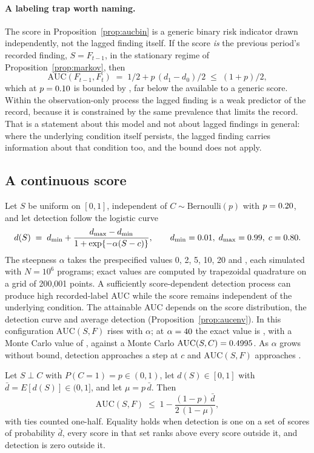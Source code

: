 \paragraph{A labeling trap worth naming.} The score in
Proposition~\ref{prop:aucbin} is a generic binary risk indicator drawn
independently, not the lagged finding itself. If the score \emph{is} the
previous period's recorded finding, $S = F_{t-1}$, in the stationary regime of
Proposition~\ref{prop:markov}, then
%
\[
  \mathrm{AUC}(F_{t-1}, F_t) \;=\; 1/2 + p\,(d_1 - d_0)/2
  \;\leq\; (1+p)/2,
\]
%
which at $p = 0.10{}$ is bounded by \nBinStationaryBound{}, far below the
\nBinAucExact{} available to a generic score. Within the observation-only
process the lagged finding is a weak predictor of the record, because it is
constrained by the same prevalence that limits the record. That is a statement
about this model and not about lagged findings in general: where the
underlying condition itself persists, the lagged finding carries information
about that condition too, and the bound does not apply.

\subsection{A continuous score}

Let $S$ be uniform on $[0,1]$, independent of $C \sim \mathrm{Bernoulli}(p)$
with $p = 0.20{}$, and let detection follow the logistic curve
%
\[
  d(S) \;=\; d_{\min} + \frac{d_{\max} - d_{\min}}{1 + \exp\{-\alpha (S - c)\}} ,
  \qquad d_{\min} = 0.01{},\; d_{\max} = 0.99{},\; c = 0.80{} .
\]
%
The steepness $\alpha$ takes the prespecified values 0, 2, 5, 10, 20 and
\nContAlphaMax{}, each simulated with $N = 10^6$ programs; exact values are
computed by trapezoidal quadrature on a grid of 200,001 points. A sufficiently
score-dependent detection process can produce high recorded-label AUC while
the score remains independent of the underlying condition. The attainable AUC
depends on the score distribution, the detection curve and average detection
(Proposition~\ref{prop:aucenv}). In this configuration $\mathrm{AUC}(S,F)$
rises with $\alpha$; at $\alpha = 40{}$ the exact value is
\nContAucExact{}, with a Monte Carlo value of \nContAucMC{}, against a Monte
Carlo $\mathrm{AUC}(S,C) = 0.4995{}$. As $\alpha$ grows without bound,
detection approaches a step at $c$ and $\mathrm{AUC}(S,F)$ approaches
\nContAucLimit{}.

\begin{proposition}\label{prop:aucenv}
Let $S \perp C$ with $P(C = 1) = p \in (0,1)$, let $d(S) \in [0,1]$ with
$\bar d = E[d(S)] \in (0,1]$, and let $\mu = p\,\bar d$. Then
%
\[
  \mathrm{AUC}(S,F) \;\le\; 1 - \frac{(1-p)\,\bar d}{2\,(1 - \mu)} ,
\]
%
with ties counted one-half. Equality holds when detection is one on a set of
scores of probability $\bar d$, every score in that set ranks above every score
outside it, and detection is zero outside it.
\end{proposition}

